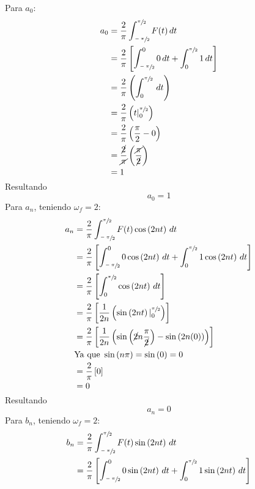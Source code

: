 \begin{multicols}{2}
Para $a_0$:
\begin{align*}
    a_0 &= \frac{2}{\pi} \int_{\sfrac{-\pi}{2}}^{\sfrac{\pi}{2}} F(t) \,dt\\
    &= \frac{2}{\pi} \left[\int_{\sfrac{-\pi}{2}}^{0} 0 \,dt + \int_{0}^{\sfrac{\pi}{2}} 1 \,dt\right]\\
    &= \frac{2}{\pi} \left(\int_{0}^{\sfrac{\pi}{2}}\,dt\right)\\
    &= \frac{2}{\pi} \left(t |^{\sfrac{\pi}{2}}_{0}\right)\\
    &= \frac{2}{\pi} \left(\frac{\pi}{2} - 0\right)\\
    &= \frac{\cancel{2}}{\cancel{\pi}} \left(\frac{\cancel{\pi}}{\cancel{2}}\right)\\
    &= 1
\end{align*}
Resultando
\begin{equation}
    a_0 = 1
    \label{res:3}
\end{equation}
Para $a_n$, teniendo $\omega_f = 2$:
\begin{align*}
    a_n &= \frac{2}{\pi} \int_{\sfrac{-\pi}{2}}^{\sfrac{\pi}{2}} F(t) \cos\left(2nt\right) \,dt\\
    &= \frac{2}{\pi} \left[\int_{\sfrac{-\pi}{2}}^{0} 0 \cos\left(2nt\right) \,dt + \int_{0}^{\sfrac{\pi}{2}} 1 \cos\left(2nt\right) \,dt\right]\\
    &= \frac{2}{\pi} \left[\int_{0}^{\sfrac{\pi}{2}}\cos\left(2nt\right) \,dt\right]\\
    &= \frac{2}{\pi} \left[\frac{1}{2n} \left(\sin\left(2nt\right) |^{\sfrac{\pi}{2}}_{0}\right)\right]\\
    &= \frac{2}{\pi} \left[\frac{1}{2n} \left(\sin\left(\cancel{2}n\frac{\pi}{\cancel{2}}\right) - \sin\left(2n(0)\right)\right)\right]\\
    &\mathrm{Ya~que}~\sin\left(n\pi\right) = \sin\left(0\right) = 0\\
    &= \frac{2}{\pi} \left[0\right]\\
    &= 0
\end{align*}
Resultando
\begin{equation}
    a_n = 0
    \label{res:4}
\end{equation}
Para $b_n$, teniendo $\omega_f = 2$:
\begin{align*}
    b_n &= \frac{2}{\pi} \int_{\sfrac{-\pi}{2}}^{\sfrac{\pi}{2}} F(t) \sin\left(2nt\right) \,dt\\
    &= \frac{2}{\pi} \left[\int_{\sfrac{-\pi}{2}}^{0} 0 \sin\left(2nt\right) \,dt + \int_{0}^{\sfrac{\pi}{2}} 1 \sin\left(2nt\right) \,dt\right]\\

\end{align*}
\end{multicols}
